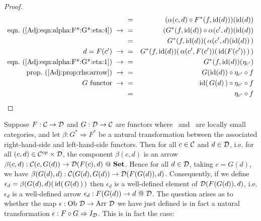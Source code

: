 \begin{proof}
\begin{eqnarray*}
            &=&(\alpha(c,d)\circ F^{*}(f,\id(d)))(\id(d))\\
            \mbox{eqn.~(\ref{Adj:eqn:alpha:F*:G*:eta:4})}\ \to\ 
            &=&(G^{*}(f,\id(d))\circ\alpha(c',d))(\id(d))\\
            &=&G^{*}(f,\id(d))(\,\alpha(c',d)(\id(d))\,)\\
            \mbox{$d=F(c')$}\ \to\ 
            &=&G^{*}(f,\id(d))(\,\alpha(c',F(c'))(\,\id(F(c'))\,)\,)\\
            \mbox{eqn.~(\ref{Adj:eqn:alpha:F*:G*:eta:1})}\ \to\ 
            &=&G^{*}(f,\id(d))(\eta_{c'})\\
            \mbox{prop.~(\ref{Adj:prop:rhs:arrow})}\ \to\ 
            &=&G(\id(d))\circ\eta_{c'}\circ f\\
            \mbox{$G$ functor}\ \to\ 
            &=&\id(\,G(d)\,)\circ\eta_{c'}\circ f\\
            &=&\eta_{c'}\circ f\\
        \end{eqnarray*}
\end{proof}

Suppose $F:\mbox{$\cal C$}\to\mbox{$\cal D$}$ and $G:\mbox{$\cal D$}\to\mbox{$\cal C$}$ are functors where \Cat\ and \Dat\ 
are locally small categories, and let $\beta:G^{*}\Rightarrow F^{*}$ be a 
natural transformation between the associated right-hand-side and left-hand-side
functors. Then for all $c\in\mbox{$\cal C$}$ and $d\in\mbox{$\cal D$}$, i.e. for all $(c,d)\in
\mbox{${\cal C}^{op}$}\times\mbox{$\cal D$}$, the component $\beta(c,d)$ is an arrow
$\beta(c,d):\Cat(c,G(d))\to\Dat(F(c),d)\ @\ \Set$. Hence for all $d\in\mbox{$\cal D$}$,
taking $c=G(d)$, we have $\beta(G(d),d):\mbox{$\cal C$}(G(d),G(d))\to\mbox{$\cal D$}(F(G(d)),d)$.
Consequently, if we define $\epsilon_{d}=\beta(G(d),d)(\,\mbox{\rm id}(\,G(d)\,)\,)$ then
$\epsilon_{d}$ is a well-defined element of $\mbox{$\cal D$}(F(G(d)),d)$, i.e.
$\epsilon_{d}$ is a well-defined arrow $\epsilon_{d}:F(G(d))\to d\ @\ \mbox{$\cal D$}$. The question
arises as to whether the map $\epsilon:\mbox{\rm Ob}\ \mbox{$\cal D$}\to\mbox{\rm Arr}\ \mbox{$\cal D$}$ we have just defined
is in fact a natural transformation $\epsilon:F\circ G\Rightarrow I_{\cal D}$.
This is in fact the case:

